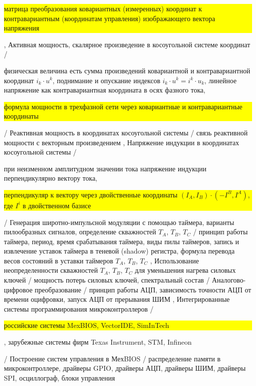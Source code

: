 {{   \colorbox{yellow}{\parbox{0.82\textwidth}{матрица преобразования ковариантных (измеренных) координат к контравариантным (координатам управления) изображающего вектора напряжения}}
},
{Активная мощность, скалярное произведение в косоугольной системе координат}
/{
   физическая величина есть сумма произведений ковариантной и контравариантной координат $i_k\cdot u^k$,
   поднимание и опускание индексов $i_k\cdot u^k = i^k\cdot u_k$,
   линейное напряжение как контравариантная координата в осях фазного тока,
   \colorbox{yellow}{\parbox{0.82\textwidth}{формула мощности в трехфазной сети через ковариантные и контравариантные координаты}}
}/
Реактивная мощность в координатах косоугольной системы
/{ связь реактивной мощности с векторным произведением
},
Напряжение индукции в координатах косоугольной системы
/{
  при неизменном амплитудном значении тока напряжение индукции перпендикулярно вектору тока,
  \colorbox{yellow}{\parbox{0.82\textwidth}{перпендикуляр к вектору через двойственные координаты $(I_A, I_B)\cdot (-I^B, I^A)$, где $I^i$ в двойственном базисе}}
}/
{Генерация широтно-импульсной модуляции с помощью таймера, варианты пилообразных сигналов, определение скважностей $T_A$, $T_B$, $T_C$}
/{
   {принцип работы таймера, период, время срабатывания таймера},
   виды пилы таймеров,
   запись и извлечение уставок таймера в теневой (shadow) регистра,
   {формула перевода весов состояний в уставки таймеров $T_A$, $T_B$, $T_C$}
},
{Использование неопределенности скважностей $T_A$, $T_B$, $T_C$ для уменьшения нагрева силовых ключей}
/{
   мощность потерь силовых ключей,
   спектральный состав
}/
Аналогово-цифровое преобразование
/{
   принцип работы АЦП,
   зависимость точности АЦП от времени оцифровки,
   запуск АЦП от прерывания ШИМ
},
Интегрированные системы программирования микроконтроллеров
/{
    \colorbox{yellow}{\parbox{0.82\textwidth}{российские системы MexBIOS, VectorIDE, SimInTech}},
    {зарубежные системы фирм Texas Instrument, STM, Infineon}
}/
Построение систем управления в МехBIOS
/{
   распределение памяти в микроконтроллере,
   драйверы GPIO,
   драйверы АЦП,
   драйверы ШИМ,
   драйверы SPI,
   осциллограф,
   блоки управления
}} {
}
